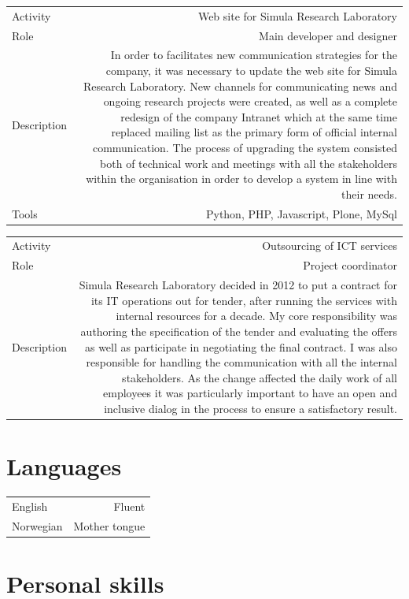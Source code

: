 \documentclass[english,a4paper,11pt]{article}
\begin{document}
\begin{tabular}{@{}LR}
Activity & Web site for Simula Research Laboratory \\ 
Role & Main developer and designer \\ 
Description & In order to facilitates new communication strategies for the company, it was necessary to update the web site for Simula Research Laboratory. New channels for communicating news and ongoing research projects were created, as well as a complete redesign of the company Intranet which at the same time replaced mailing list as the primary form of official internal communication. The process of upgrading the system consisted both of technical work and meetings with all the stakeholders within the organisation in order to develop a system in line with their needs. \\ 
Tools & Python, PHP, Javascript, Plone, MySql \\ 
\end{tabular}

\begin{tabular}{@{}LR}
Activity & Outsourcing of ICT services \\ 
Role & Project coordinator \\ 
Description & Simula Research Laboratory decided in 2012 to put a contract for its IT operations out for tender, after running the services with internal resources for a decade. My core responsibility was authoring the specification of the tender and evaluating the offers as well as participate in negotiating the final contract. I was also responsible for handling the communication with all the internal stakeholders. As the change affected the daily work of all employees it was particularly important to have an open and inclusive dialog in the process to ensure a satisfactory result. \\ 
\end{tabular}


\section*{Languages}

\begin{tabular}{LR}
English & Fluent\\ 
Norwegian & Mother tongue\\ 
\end{tabular}

\section*{Personal skills}
\end{document}
